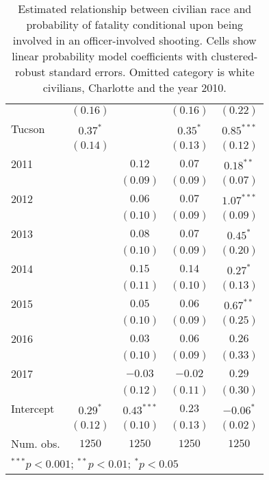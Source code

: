 \begin{table}[ht!]
\begin{center}
\begin{tabular}{l c c c c}
                           & $(0.16)$    &              & $(0.16)$    & $(0.22)$     \\
Tucson                     & $0.37^{*}$  &              & $0.35^{*}$  & $0.85^{***}$ \\
                           & $(0.14)$    &              & $(0.13)$    & $(0.12)$     \\
2011                       &             & $0.12$       & $0.07$      & $0.18^{**}$  \\
                           &             & $(0.09)$     & $(0.09)$    & $(0.07)$     \\
2012                       &             & $0.06$       & $0.07$      & $1.07^{***}$ \\
                           &             & $(0.10)$     & $(0.09)$    & $(0.09)$     \\
2013                       &             & $0.08$       & $0.07$      & $0.45^{*}$   \\
                           &             & $(0.10)$     & $(0.09)$    & $(0.20)$     \\
2014                       &             & $0.15$       & $0.14$      & $0.27^{*}$   \\
                           &             & $(0.11)$     & $(0.10)$    & $(0.13)$     \\
2015                       &             & $0.05$       & $0.06$      & $0.67^{**}$  \\
                           &             & $(0.10)$     & $(0.09)$    & $(0.25)$     \\
2016                       &             & $0.03$       & $0.06$      & $0.26$       \\
                           &             & $(0.10)$     & $(0.09)$    & $(0.33)$     \\
2017                       &             & $-0.03$      & $-0.02$     & $0.29$       \\
                           &             & $(0.12)$     & $(0.11)$    & $(0.30)$     \\
Intercept                  & $0.29^{*}$  & $0.43^{***}$ & $0.23$      & $-0.06^{*}$  \\
                           & $(0.12)$    & $(0.10)$     & $(0.13)$    & $(0.02)$     \\
\midrule
Num. obs.                  & $1250$      & $1250$       & $1250$      & $1250$       \\
\bottomrule
\multicolumn{5}{l}{\scriptsize{$^{***}p<0.001$; $^{**}p<0.01$; $^{*}p<0.05$}}
\end{tabular}
\caption{Estimated relationship between civilian race and probability of fatality conditional upon being involved in an officer-involved shooting. Cells show linear probability model coefficients with clustered-robust standard errors. Omitted category is white civilians, Charlotte and the year 2010.}
\label{tab:lpm_FE}
\end{center}
\end{table}
